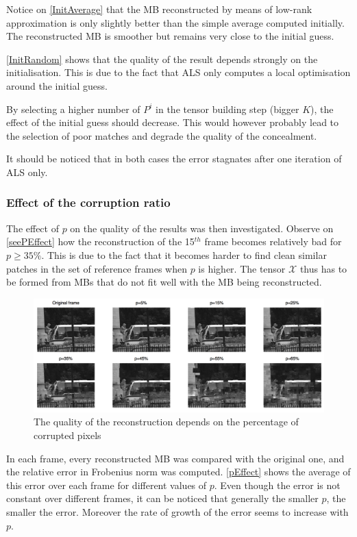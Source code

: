 \documentclass[a4paper, 11pt]{article} %
\def \X {\mathcal{X}}
\begin{document}
Notice on \autoref{InitAverage} that the MB reconstructed by means of low-rank approximation is only slightly better than the simple average computed initially. The reconstructed MB is smoother but remains very close to the initial guess.

\autoref{InitRandom} shows that the quality of the result depends strongly on the initialisation. This is due to the fact that ALS only computes a local optimisation around the initial guess.

By selecting a higher number of $P^i$ in the tensor building step (bigger $K$), the effect of the initial guess should decrease. This would however probably lead to the selection of poor matches and degrade the quality of the concealment.

It should be noticed that in both cases the error stagnates after one iteration of ALS only.

\subsubsection{Effect of the corruption ratio}
The effect of $p$ on the quality of the results was then investigated. Observe on \autoref{seePEffect} how the reconstruction of the 15$^{th}$ frame becomes relatively bad for $p\geqslant 35\%$. This is due to the fact that it becomes harder to find clean similar patches in the set of reference frames when $p$ is higher. The tensor $\X$ thus has to be formed from MBs that do not fit well with the MB being reconstructed.

\begin{figure}[h!]
\centering
\includegraphics[scale=0.6]{seePEffect}
\caption{The quality of the reconstruction depends on the percentage of corrupted pixels\label{seePEffect}}
\end{figure}

In each frame, every reconstructed MB was compared with the original one, and the relative error in Frobenius norm was computed. \autoref{pEffect} shows the average of this error over each frame for different values of $p$. Even though the error is not constant over different frames, it can  be noticed that generally the smaller $p$, the smaller the error. Moreover the rate of growth of the error seems to increase with $p$.
\end{document}
